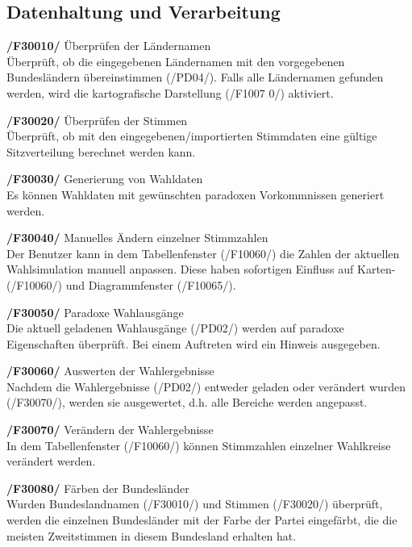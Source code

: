 \documentclass[10pt,a4paper]{article}
\begin{document}
\subsection{Datenhaltung und Verarbeitung}
\begin{list}{\quad}{}
	\item \textbf{/F30010/} Überprüfen der Ländernamen \hfill \\
	Überprüft, ob die eingegebenen Ländernamen mit den vorgegebenen Bundesländern übereinstimmen (/PD04/). Falls alle Ländernamen gefunden werden, wird die kartografische Darstellung (/F1007	0/) aktiviert.
	\item \textbf{/F30020/} Überprüfen der Stimmen\hfill \\
	Überprüft, ob mit den eingegebenen/importierten Stimmdaten eine gültige Sitzverteilung berechnet werden kann.		
	\item \textbf{/F30030/} Generierung von Wahldaten \hfill \\
	Es können Wahldaten mit gewünschten paradoxen Vorkommnissen generiert werden.
	\item \textbf{/F30040/} Manuelles Ändern einzelner Stimmzahlen \hfill \\
	Der Benutzer kann in dem Tabellenfenster (/F10060/) die Zahlen der aktuellen Wahlsimulation manuell anpassen.
	Diese haben sofortigen Einfluss auf Karten- (/F10060/) und Diagrammfenster (/F10065/).
	\item \textbf{/F30050/} Paradoxe Wahlausgänge \hfill \\
	Die aktuell geladenen Wahlausgänge (/PD02/) werden auf paradoxe Eigenschaften überprüft. Bei einem Auftreten wird ein Hinweis ausgegeben.
	\item \textbf{/F30060/} Auswerten der Wahlergebnisse \hfill \\
	Nachdem die Wahlergebnisse (/PD02/) entweder geladen oder verändert wurden (/F30070/), werden sie ausgewertet, d.h. alle Bereiche werden angepasst.
	\item \textbf{/F30070/} Verändern der Wahlergebnisse \hfill \\
	In dem Tabellenfenster (/F10060/) können Stimmzahlen einzelner Wahlkreise verändert werden.
	\item \textbf{/F30080/} Färben der Bundesländer \hfill \\
	Wurden Bundeslandnamen (/F30010/) und Stimmen (/F30020/) überprüft, werden die einzelnen Bundesländer mit der Farbe der Partei eingefärbt, die die meisten Zweitstimmen in diesem Bundesland erhalten hat.
	
\end{list}
\end{document}
